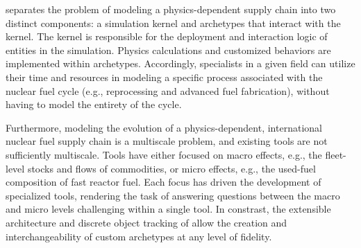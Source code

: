\Cyclus separates the problem of modeling a
physics-dependent supply chain into two distinct components: a simulation kernel and archetypes that
interact with the kernel. The kernel is responsible for the
deployment and interaction logic of entities in the simulation.  Physics calculations and 
customized behaviors are implemented within archetypes. Accordingly, specialists
in a given field can utilize their time and resources in modeling a specific
process associated with the nuclear fuel cycle (e.g., reprocessing and advanced
fuel fabrication), without having to model the entirety of the cycle.

Furthermore, modeling the evolution of a physics-dependent, international nuclear fuel supply
chain is a multiscale problem, and existing tools are not sufficiently 
multiscale. Tools have either focused on macro effects, e.g., the fleet-level
stocks and flows of commodities, or micro effects, e.g., the used-fuel
composition of fast reactor fuel. Each focus has driven the
development of specialized tools, rendering the task of answering questions between
the macro and micro levels challenging within a single tool. 
In constrast, the extensible architecture and discrete object tracking of \Cyclus allow
the creation and interchangeability of custom archetypes at any level of fidelity.
